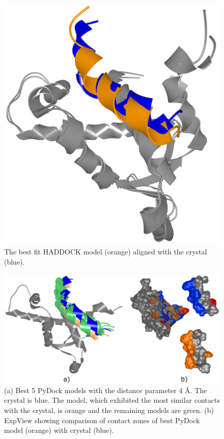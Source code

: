 \documentclass{bmcart}
\begin{document}
\begin{backmatter}
\begin{figure}[h!]
  \centering
  \includegraphics[width=\columnwidth]{images/figure17.png}
  \caption{ The best fit HADDOCK model (orange) aligned with the crystal (blue).}
  \label{fig:MukEF_selection_3_best_pair}
\end{figure}

\begin{figure}[h!]
    \centering 
    \includegraphics[width=\columnwidth]{images/figure18.pdf}
    \caption{(a) Best 5 PyDock models with the distance parameter 4 \AA. The crystal is blue. The model, which exhibited the most similar contacts with the crystal, is orange and the remaining models are green. (b) ExpView showing comparison of contact zones of best PyDock model (orange) with crystal (blue).}
  \label{fig:pydock_pocket_string}
\end{figure}




\end{backmatter}
\end{document}
